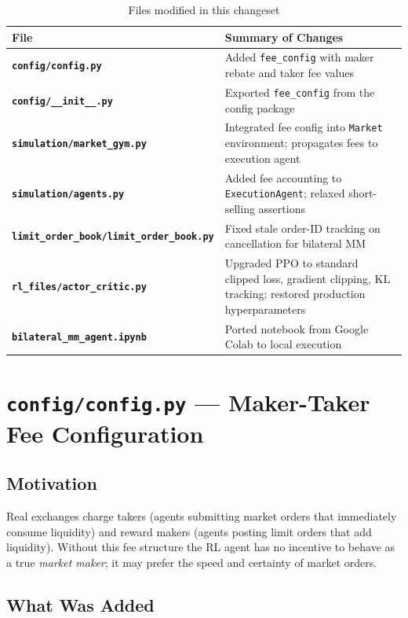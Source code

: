 \documentclass[11pt,a4paper]{article}
\newcommand{\filename}[1]{\texttt{\textbf{\color{accentblue}#1}}}
\begin{document}
\begin{table}[h!]
\centering
\renewcommand{\arraystretch}{1.3}
\begin{tabularx}{\linewidth}{lX}
\toprule
\textbf{File} & \textbf{Summary of Changes} \\
\midrule
\filename{config/config.py} & Added \texttt{fee\_config} with maker rebate and taker fee values \\
\filename{config/\_\_init\_\_.py} & Exported \texttt{fee\_config} from the config package \\
\filename{simulation/market\_gym.py} & Integrated fee config into \texttt{Market} environment; propagates fees to execution agent \\
\filename{simulation/agents.py} & Added fee accounting to \texttt{ExecutionAgent}; relaxed short-selling assertions \\
\filename{limit\_order\_book/limit\_order\_book.py} & Fixed stale order-ID tracking on cancellation for bilateral MM \\
\filename{rl\_files/actor\_critic.py} & Upgraded PPO to standard clipped loss, gradient clipping, KL tracking; restored production hyperparameters \\
\filename{bilateral\_mm\_agent.ipynb} & Ported notebook from Google Colab to local execution \\
\bottomrule
\end{tabularx}
\caption{Files modified in this changeset}
\end{table}

\section{\texttt{config/config.py} — Maker-Taker Fee Configuration}

\subsection{Motivation}

Real exchanges charge takers (agents submitting market orders that
immediately consume liquidity) and reward makers (agents posting limit
orders that add liquidity).  Without this fee structure the RL agent
has no incentive to behave as a true \emph{market maker}; it may prefer
the speed and certainty of market orders.

\subsection{What Was Added}
\end{document}
